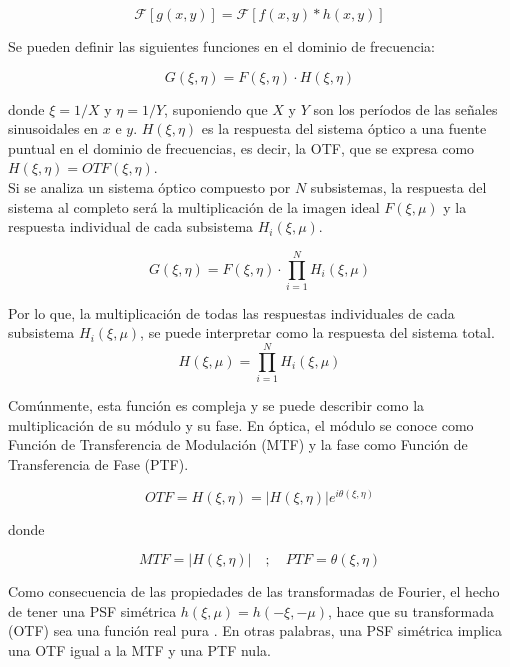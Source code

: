 \documentclass[12pt]{article}
\numberwithin{equation}{section}%
\begin{document}
\begin{equation}
\mathcal{F}[g(x, y)] = \mathcal{F}[f(x, y) * h(x, y)]
\end{equation}

Se pueden definir las siguientes funciones en el dominio de frecuencia:

\begin{equation}
G(\xi, \eta) = F(\xi, \eta) \cdot H(\xi, \eta)
\end{equation}

donde $\xi = 1/X$ y $\eta = 1/Y$, suponiendo que $X$ y $Y$ son los períodos de las señales sinusoidales en $x$ e $y$. $H(\xi, \eta)$ es la respuesta del sistema óptico a una fuente puntual en el dominio de frecuencias, es decir, la OTF, que se expresa como $H(\xi, \eta) = OTF(\xi, \eta)$.\\

Si se analiza un sistema óptico compuesto por \(N\) subsistemas, la respuesta del sistema al completo será la multiplicación de la imagen ideal \(F(\xi, \mu)\) y la respuesta individual de cada subsistema \(H_i(\xi, \mu)\).

\begin{equation}
G(\xi, \eta) = F(\xi, \eta) \cdot \prod_{i=1}^NH_i(\xi, \mu)
\end{equation}

Por lo que, la multiplicación de todas las respuestas individuales de cada subsistema \(H_i(\xi, \mu)\), se puede interpretar como la respuesta del sistema total.\\

\begin{equation*}
    H(\xi, \mu) = \prod_{i=1}^NH_i(\xi, \mu)
\end{equation*}

Comúnmente, esta función es compleja y se puede describir como la multiplicación de su módulo y su fase. En óptica, el módulo se conoce como Función de Transferencia de Modulación (MTF) y la fase como Función de Transferencia de Fase (PTF).

\newpage
\begin{equation}
    OTF = H(\xi, \eta) = |H(\xi, \eta)| e^{i\theta(\xi, \eta)}
\end{equation}

donde

\begin{equation*}
    MTF = |H(\xi, \eta)| \quad ; \quad PTF = \theta(\xi, \eta)
\end{equation*}

Como consecuencia de las propiedades de las transformadas de Fourier, el hecho de tener una PSF simétrica \(h(\xi, \mu) = h(-\xi, -\mu)\), hace que su transformada (OTF) sea una función real pura \cite{bracewell2000}. En otras palabras, una PSF simétrica implica una OTF igual a la MTF y una PTF nula.\\
\end{document}
